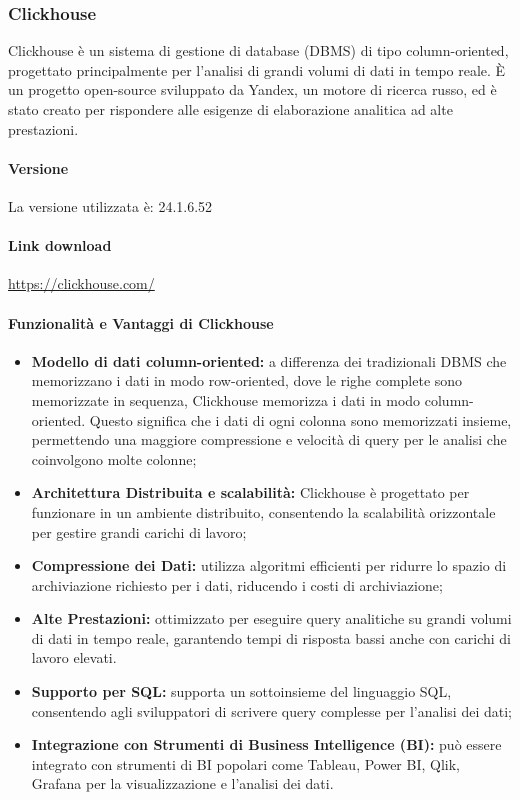 \subsubsection{Clickhouse} \label{sec:clickHouse}
Clickhouse è un sistema di gestione di database (DBMS) di tipo column-oriented, progettato principalmente per l'analisi di grandi volumi di dati in tempo reale. È un progetto open-source sviluppato da Yandex, un motore di ricerca russo, ed è stato creato per rispondere alle esigenze di elaborazione analitica ad alte prestazioni.
\paragraph{Versione}
La versione utilizzata è: 24.1.6.52
\paragraph{Link download}
\href{https://clickhouse.com/}{https://clickhouse.com/}

\paragraph{Funzionalità e Vantaggi di Clickhouse}
\begin{itemize}
    \item \textbf{ Modello di dati column-oriented:} a differenza dei tradizionali DBMS che memorizzano i dati in modo row-oriented, dove le righe complete sono memorizzate in sequenza, Clickhouse memorizza i dati in modo column-oriented. Questo significa che i dati di ogni colonna sono memorizzati insieme, permettendo una maggiore compressione e velocità di query per le analisi che coinvolgono molte colonne;
    \item \textbf{Architettura Distribuita e scalabilità:} Clickhouse è progettato per funzionare in un ambiente distribuito, consentendo la scalabilità orizzontale per gestire grandi carichi di lavoro;
    \item \textbf{Compressione dei Dati:} utilizza algoritmi efficienti per ridurre lo spazio di archiviazione richiesto per i dati, riducendo i costi di archiviazione;
    \item \textbf{Alte Prestazioni:} ottimizzato per eseguire query analitiche su grandi volumi di dati in tempo reale, garantendo tempi di risposta bassi anche con carichi di lavoro elevati.
    \item \textbf{Supporto per SQL:} supporta un sottoinsieme del linguaggio SQL, consentendo agli sviluppatori di scrivere query complesse per l'analisi dei dati;
    \item \textbf{Integrazione con Strumenti di Business Intelligence (BI):} può essere integrato con strumenti di BI popolari come Tableau, Power BI, Qlik, Grafana per la visualizzazione e l'analisi dei dati.
\end{itemize}


